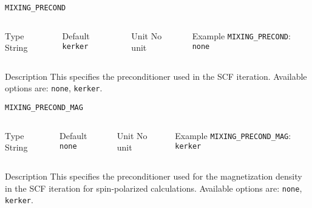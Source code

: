 \begin{frame}[allowframebreaks]{\texttt{MIXING\_PRECOND}} \label{MIXING_PRECOND}
\vspace*{-12pt}
\begin{columns}
\begin{block}{Type}
String
\end{block}

\begin{block}{Default}
\texttt{kerker}
\end{block}

\begin{block}{Unit}
No unit
\end{block}

\begin{block}{Example}
\texttt{MIXING\_PRECOND}: \texttt{none}
\end{block}
\end{columns}

\begin{block}{Description}
This specifies the preconditioner used in the SCF iteration. Available options are: \texttt{none}, \texttt{kerker}.
\end{block}

\end{frame}


\begin{frame}[allowframebreaks]{\texttt{MIXING\_PRECOND\_MAG}} \label{MIXING_PRECOND_MAG}
\vspace*{-12pt}
\begin{columns}
\begin{block}{Type}
String
\end{block}

\begin{block}{Default}
\texttt{none}
\end{block}

\begin{block}{Unit}
No unit
\end{block}

\begin{block}{Example}
\texttt{MIXING\_PRECOND\_MAG}: \texttt{kerker}
\end{block}
\end{columns}

\begin{block}{Description}
This specifies the preconditioner used for the magnetization density in the SCF iteration for spin-polarized calculations. Available options are: \texttt{none}, \texttt{kerker}.
\end{block}

\end{frame}



